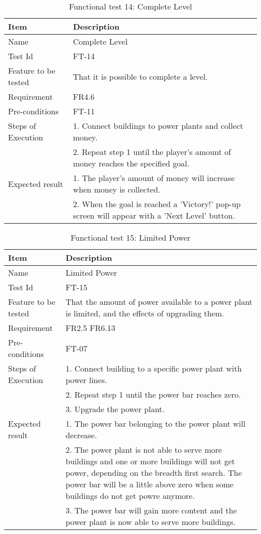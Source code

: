 \begin{table}[H]
\centering
	\begin{tabular}{ l | p{8cm} }
		\hline
		\rowcolor{lightgray}
		{\bf Item} & {\bf Description} \\ \hline
		Name & Complete Level \\ 
		Test Id & FT-14 \\ 
		Feature to be tested & That it is possible to complete a level. \\ 
		Requirement & FR4.6 \\ 
		Pre-conditions & FT-11 \\ 
		Steps of Execution & 1. Connect buildings to power plants and collect money. \\ 
		& 2. Repeat step 1 until the player's amount of money reaches the specified goal. \\
		Expected result & 1. The player's amount of money will increase when money is collected. \\ 
		& 2. When the goal is reached a 'Victory!' pop-up screen will appear with a 'Next Level' button. \\
		\hline
	\end{tabular}
	\caption{Functional test 14: Complete Level}
\end{table}

\begin{table}[H]
\centering
	\begin{tabular}{ l | p{8cm} }
		\hline
		\rowcolor{lightgray}
		{\bf Item} & {\bf Description} \\ \hline
		Name & Limited Power \\ 
		Test Id & FT-15 \\ 
		Feature to be tested & That the amount of power available to a power plant is limited, and the effects of upgrading them. \\ 
		Requirement & FR2.5 FR6.13 \\ 
		Pre-conditions & FT-07 \\ 
		Steps of Execution & 1. Connect building to a specific power plant with power lines. \\
		& 2. Repeat step 1 until the power bar reaches zero. \\
		& 3. Upgrade the power plant. \\
		Expected result & 1. The power bar belonging to the power plant will decrease. \\
		& 2. The power plant is not able to serve more buildings and one or more buildings will not get power, depending on the breadth first search. The power bar will be a little above zero when some buildings do not get powre anymore. \\ 
		& 3. The power bar will gain more content and the power plant is now able to serve more buildings. \\
		\hline
	\end{tabular}
	\caption{Functional test 15: Limited Power}
\end{table}

